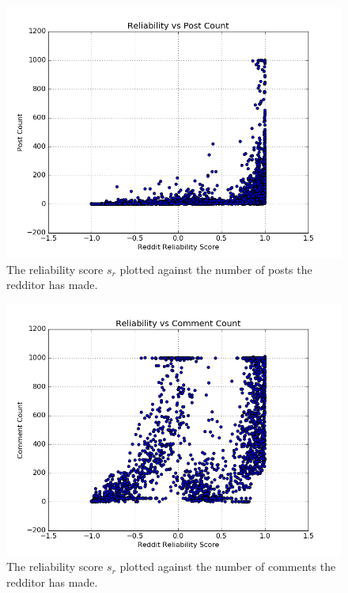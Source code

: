 \begin{figure}[tb]
    \centering
    \includegraphics[width=\linewidth]{../src/do_regression/figs/reliability_post_count.png}
    \caption{The reliability score $s_r$ plotted against the number of posts the redditor has made.}
    \label{fig:reliability_post_count}
\end{figure}

\begin{figure}[tb]
    \centering
    \includegraphics[width=\linewidth]{../src/do_regression/figs/reliability_comment_count.png}
    \caption{The reliability score $s_r$ plotted against the number of comments the redditor has made.}
    \label{fig:reliability_comment_count}
\end{figure}

